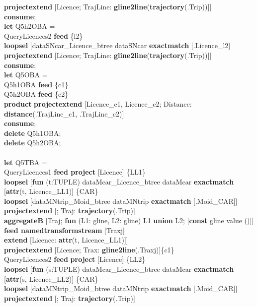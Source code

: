 \documentclass[a4paper]{article}
\newcommand{\op}[1]{\textbf{#1}}
\begin{document}
\begin{scriptsize}
\begin{tabbing}
\>\>\op{projectextend} [Licence; TrajLine: \op{gline2line}(\op{trajectory}(.Trip))]]\\
\op{consume};\\
\op{let} Q5h2OBA =\\
\>QueryLicences2 \op{feed} \{l2\}\\
\>\op{loopsel} [dataSNcar\_Licence\_btree dataSNcar \op{exactmatch} [.Licence\_l2]\\
\>\>\op{projectextend} [Licence; TrajLine: \op{gline2line}(\op{trajectory}(.Trip))]]\\
\op{consume};\\
\op{let} Q5OBA =\\
\>Q5h1OBA \op{feed} \{c1\}\\
\>Q5h2OBA \op{feed} \{c2\}\\
\>\op{product}
\>\op{projectextend} [Licence\_c1, Licence\_c2; Distance: \op{distance}(.TrajLine\_c1, .TrajLine\_c2)]\\
\op{consume};\\
\op{delete} Q5h1OBA;\\
\op{delete} Q5h2OBA;\\
\\
\op{let} Q5TBA =\\
\>QueryLicences1 \op{feed project} [Licence] \{LL1\}\\
\>\>\op{loopsel} [\op{fun} (t:TUPLE) dataMcar\_Licence\_btree dataMcar \op{exactmatch} [\op{attr}(t, Licence\_LL1)] \{CAR\}\\
\>\>\>\op{loopsel} [dataMNtrip\_Moid\_btree dataMNtrip \op{exactmatch} [.Moid\_CAR]]\\
\>\>\>\op{projectextend}  [; Traj: \op{trajectory}(.Trip)]\\
\>\>\>\op{aggregateB} [Traj; \op{fun} (L1: gline, L2: gline) L1 \op{union} L2; [\op{const} gline value ()]]\\
\>\>\>\op{feed namedtransformstream} [Traxj]\\
\>\>\>\op{extend} [Licence: \op{attr}(t, Licence\_LL1)]]\\
\>\>\op{projectextend} [Licence; Trax: \op{gline2line}(.Traxj)]\{c1\}\\
\>QueryLicences2 \op{feed} \op{project} [Licence] \{LL2\}\\
\>\>\op{loopsel} [\op{fun} (s:TUPLE) dataMcar\_Licence\_btree dataMcar \op{exactmatch} [\op{attr}(s, Licence\_LL2)] \{CAR\}\\
\>\>\>\op{loopsel} [dataMNtrip\_Moid\_btree dataMNtrip \op{exactmatch} [.Moid\_CAR]]\\
\>\>\>\op{projectextend} [; Traj: \op{trajectory}(.Trip)]\\

\end{tabbing}
\end{scriptsize}
\end{document}
